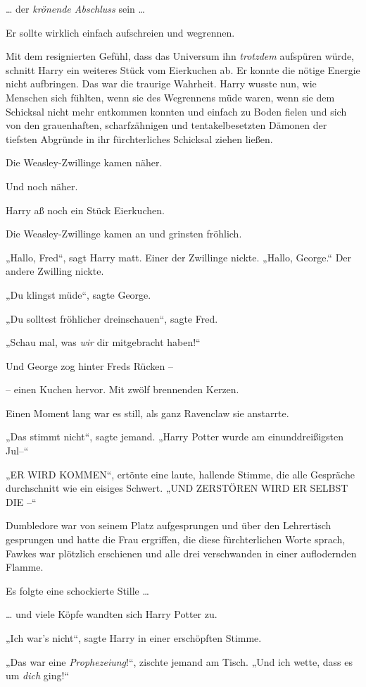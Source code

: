 {… der \emph{krönende Abschluss} sein …

Er sollte wirklich einfach aufschreien und wegrennen.

Mit dem resignierten Gefühl, dass das Universum ihn \emph{trotzdem} aufspüren würde, schnitt Harry ein weiteres Stück vom Eierkuchen ab. Er konnte die nötige Energie nicht aufbringen. Das war die traurige Wahrheit. Harry wusste nun, wie Menschen sich fühlten, wenn sie des Wegrennens müde waren, wenn sie dem Schicksal nicht mehr entkommen konnten und einfach zu Boden fielen und sich von den grauenhaften, scharfzähnigen und tentakelbesetzten Dämonen der tiefsten Abgründe in ihr fürchterliches Schicksal ziehen ließen.

Die Weasley-Zwillinge kamen näher.

Und noch näher.

Harry aß noch ein Stück Eierkuchen.

Die Weasley-Zwillinge kamen an und grinsten fröhlich.

„Hallo, Fred“, sagt Harry matt. Einer der Zwillinge nickte. „Hallo, George.“ Der andere Zwilling nickte.

„Du klingst müde“, sagte George.

„Du solltest fröhlicher dreinschauen“, sagte Fred.

„Schau mal, was \emph{wir} dir mitgebracht haben!“

Und George zog hinter Freds Rücken --

-- einen Kuchen hervor. Mit zwölf brennenden Kerzen.

Einen Moment lang war es still, als ganz Ravenclaw sie anstarrte.

„Das stimmt nicht“, sagte jemand. „Harry Potter wurde am einunddreißigsten Jul--“

„ER WIRD KOMMEN“, ertönte eine laute, hallende Stimme, die alle Gespräche durchschnitt wie ein eisiges Schwert. „UND ZERSTÖREN WIRD ER SELBST DIE --“

Dumbledore war von seinem Platz aufgesprungen und über den Lehrertisch gesprungen und hatte die Frau ergriffen, die diese fürchterlichen Worte sprach, Fawkes war plötzlich erschienen und alle drei verschwanden in einer auflodernden Flamme.

Es folgte eine schockierte Stille …

… und viele Köpfe wandten sich Harry Potter zu.

„Ich war's nicht“, sagte Harry in einer erschöpften Stimme.

„Das war eine \emph{Prophezeiung}!“, zischte jemand am Tisch. „Und ich wette, dass es um \emph{dich} ging!“

}
